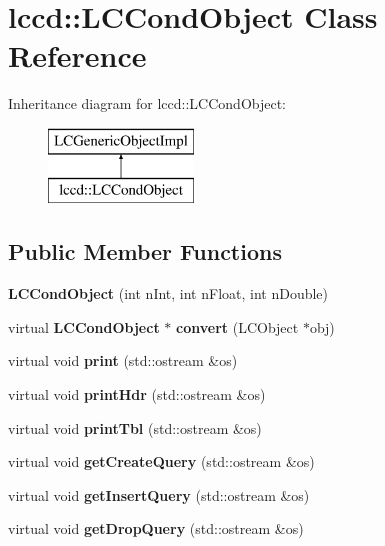 \section{lccd\-:\-:L\-C\-Cond\-Object Class Reference}
\label{classlccd_1_1LCCondObject}
Inheritance diagram for lccd\-:\-:L\-C\-Cond\-Object\-:\begin{figure}[H]
\begin{center}
\leavevmode
\includegraphics[height=2.000000cm]{classlccd_1_1LCCondObject}
\end{center}
\end{figure}
\subsection*{Public Member Functions}
\begin{DoxyCompactItemize}
\item 
{\bfseries L\-C\-Cond\-Object} (int n\-Int, int n\-Float, int n\-Double)\label{classlccd_1_1LCCondObject_a1068e8d6c4425f9d7de916a4667b3dcd}

\item 
virtual {\bf L\-C\-Cond\-Object} $\ast$ {\bfseries convert} (L\-C\-Object $\ast$obj)\label{classlccd_1_1LCCondObject_a6ea62eaaa3fbeedb6f77e4401600708d}

\item 
virtual void {\bfseries print} (std\-::ostream \&os)\label{classlccd_1_1LCCondObject_a3478d345a4cd72795ce687c204f7dfa1}

\item 
virtual void {\bfseries print\-Hdr} (std\-::ostream \&os)\label{classlccd_1_1LCCondObject_a29da862e8020fb454ba73bc703176598}

\item 
virtual void {\bfseries print\-Tbl} (std\-::ostream \&os)\label{classlccd_1_1LCCondObject_afa59727acd3d00eeac7128ecf7b56b3c}

\item 
virtual void {\bfseries get\-Create\-Query} (std\-::ostream \&os)\label{classlccd_1_1LCCondObject_a8a81b536c8bc22048eb62e1c1e205be5}

\item 
virtual void {\bfseries get\-Insert\-Query} (std\-::ostream \&os)\label{classlccd_1_1LCCondObject_a096e5cd0c805f3272e1c3e374d2d6edc}

\item 
virtual void {\bfseries get\-Drop\-Query} (std\-::ostream \&os)\label{classlccd_1_1LCCondObject_ad7e20f87d4e0cde0e6eac33255ab570c}

\end{DoxyCompactItemize}


